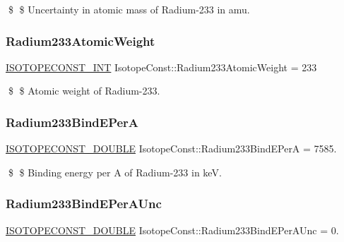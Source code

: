\$ \$ Uncertainty in atomic mass of Radium-\/233 in amu. \mbox{\label{group___isotope_const-_radium-_ra233_gad8dc237eae217c75c91ccb4eda06bfc5}} 
\subsubsection{\texorpdfstring{Radium233\+Atomic\+Weight}{Radium233AtomicWeight}}
{\footnotesize\ttfamily \mbox{\hyperlink{group___isotope_const-_macros_ga5f18360b3e99483a35c32d789e62621c}{I\+S\+O\+T\+O\+P\+E\+C\+O\+N\+S\+T\+\_\+\+I\+NT}} Isotope\+Const\+::\+Radium233\+Atomic\+Weight = 233}

\$ \$ Atomic weight of Radium-\/233. \mbox{\label{group___isotope_const-_radium-_ra233_gab038231c24ba3cddcc229f49d454130d}} 
\subsubsection{\texorpdfstring{Radium233\+Bind\+E\+PerA}{Radium233BindEPerA}}
{\footnotesize\ttfamily \mbox{\hyperlink{group___isotope_const-_macros_ga8f45a7272ce02c0b4c65c44636ed719a}{I\+S\+O\+T\+O\+P\+E\+C\+O\+N\+S\+T\+\_\+\+D\+O\+U\+B\+LE}} Isotope\+Const\+::\+Radium233\+Bind\+E\+PerA = 7585.}

\$ \$ Binding energy per A of Radium-\/233 in keV. \mbox{\label{group___isotope_const-_radium-_ra233_ga206a79f6bc883283e78f813a6a0a92b0}} 
\subsubsection{\texorpdfstring{Radium233\+Bind\+E\+Per\+A\+Unc}{Radium233BindEPerAUnc}}
{\footnotesize\ttfamily \mbox{\hyperlink{group___isotope_const-_macros_ga8f45a7272ce02c0b4c65c44636ed719a}{I\+S\+O\+T\+O\+P\+E\+C\+O\+N\+S\+T\+\_\+\+D\+O\+U\+B\+LE}} Isotope\+Const\+::\+Radium233\+Bind\+E\+Per\+A\+Unc = 0.}

